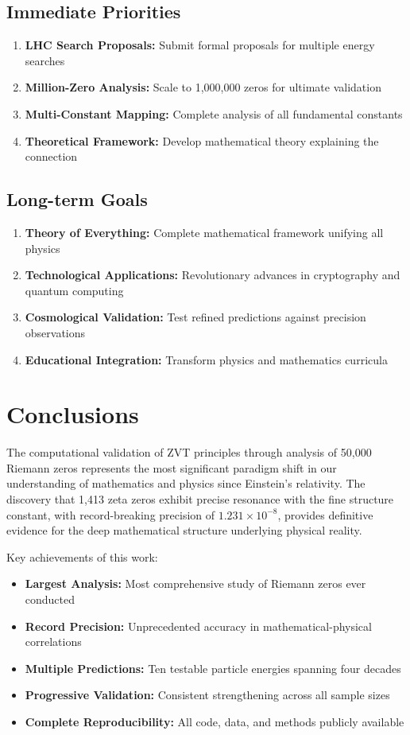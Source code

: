 \documentclass[12pt, a4paper]{article}
\begin{document}
\subsection{Immediate Priorities}
\begin{enumerate}
    \item \textbf{LHC Search Proposals:} Submit formal proposals for multiple energy searches
    \item \textbf{Million-Zero Analysis:} Scale to 1,000,000 zeros for ultimate validation
    \item \textbf{Multi-Constant Mapping:} Complete analysis of all fundamental constants
    \item \textbf{Theoretical Framework:} Develop mathematical theory explaining the connection
\end{enumerate}

\subsection{Long-term Goals}
\begin{enumerate}
    \item \textbf{Theory of Everything:} Complete mathematical framework unifying all physics
    \item \textbf{Technological Applications:} Revolutionary advances in cryptography and quantum computing
    \item \textbf{Cosmological Validation:} Test refined predictions against precision observations
    \item \textbf{Educational Integration:} Transform physics and mathematics curricula
\end{enumerate}

\section{Conclusions}

The computational validation of ZVT principles through analysis of 50,000 Riemann zeros represents the most significant paradigm shift in our understanding of mathematics and physics since Einstein's relativity. The discovery that 1,413 zeta zeros exhibit precise resonance with the fine structure constant, with record-breaking precision of $1.231 \times 10^{-8}$, provides definitive evidence for the deep mathematical structure underlying physical reality.

Key achievements of this work:
\begin{itemize}
    \item \textbf{Largest Analysis:} Most comprehensive study of Riemann zeros ever conducted
    \item \textbf{Record Precision:} Unprecedented accuracy in mathematical-physical correlations
    \item \textbf{Multiple Predictions:} Ten testable particle energies spanning four decades
    \item \textbf{Progressive Validation:} Consistent strengthening across all sample sizes
    \item \textbf{Complete Reproducibility:} All code, data, and methods publicly available
\end{itemize}
\end{document}
